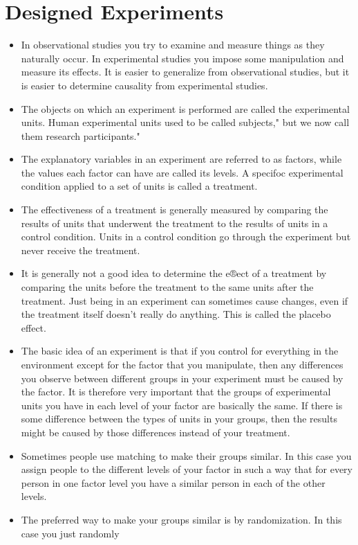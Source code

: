 \section{Designed Experiments}
\begin{itemize}
	\item In observational studies you try to examine and measure things as they naturally occur. In experimental studies you impose some manipulation and measure its effects. It is easier to generalize from
	observational studies, but it is easier to determine causality from experimental studies.
	\item The objects on which an experiment is performed are called the experimental units. Human experimental units used to be called subjects," but we now call them research participants."
	\item The explanatory variables in an experiment are referred to as factors, while the values each factor
	can have are called its levels. A specifoc experimental condition applied to a set of units is called a
	treatment.
	\item The effectiveness of a treatment is generally measured by comparing the results of units that underwent
	the treatment to the results of units in a control condition. Units in a control condition go through the
	experiment but never receive the treatment.
	\item It is generally not a good idea to determine the e®ect of a treatment by comparing the units before
	the treatment to the same units after the treatment. Just being in an experiment can sometimes cause
	changes, even if the treatment itself doesn't really do anything. This is called the placebo effect.
	\item The basic idea of an experiment is that if you control for everything in the environment except for
	the factor that you manipulate, then any differences you observe between different groups in your
	experiment must be caused by the factor. It is therefore very important that the groups of experimental
	units you have in each level of your factor are basically the same. If there is some difference between
	the types of units in your groups, then the results might be caused by those differences instead of your
	treatment.
	\item Sometimes people use matching to make their groups similar. In this case you assign people to the
	different levels of your factor in such a way that for every person in one factor level you have a similar
	person in each of the other levels.
	\item The preferred way to make your groups similar is by randomization. In this case you just randomly

\end{itemize}
